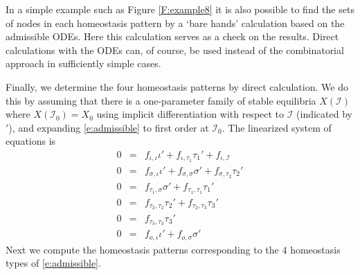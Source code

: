 \documentclass[a4paper,fleqn]{cas-dc}
\newcommand{\II}{{\mathcal I}}
\begin{document}
In a simple example such as Figure \ref{F:example8} it is also possible to find the sets of nodes in each homeostasis pattern by a `bare hands' calculation based on the admissible ODEs.
Here this calculation serves as a check on the results.  Direct calculations with the ODEs can, of course, be used instead of the combinatorial approach in sufficiently simple cases.

Finally, we determine the four homeostasis patterns by direct calculation.  We do this by  assuming that there is a one-parameter 
family of stable equilibria $X(\II)$ where $X(\II_0) = X_0$  using implicit differentiation with respect to $\II$
(indicated by $'$), and expanding \eqref{e:admissible} to first order at  $\II_0$.  The linearized system of equations is
\begin{equation}  \label{e:1st_order}
\begin{array}{rcl}
0 & = & f_{\iota,\iota}\iota' + f_{\iota,\tau_1}\tau_1' + f_{\iota,\II} \\
0 & = & f_{\sigma,\iota}\iota' + f_{\sigma,\sigma}\sigma' + f_{\sigma,\tau_2}\tau_2' \\
0 & = & f_{\tau_1,\sigma}\sigma' + f_{\tau_1,\tau_1}\tau_1' \\
0 & = & f_{\tau_2,\tau_2}\tau_2' + f_{\tau_2,\tau_3}\tau_3' \\
0 & = & f_{\tau_3,\tau_3}\tau_3'\\
0 & = & f_{o,\iota}\iota' + f_{o,\sigma}\sigma'
\end{array}
\end{equation}
Next we compute the homeostasis patterns corresponding to the $4$ homeostasis types of \eqref{e:admissible}.

\medskip
\end{document}
